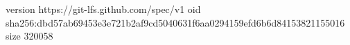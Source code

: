 version https://git-lfs.github.com/spec/v1
oid sha256:dbd57ab69453e3e721b2af9cd5040631f6aa0294159efd6b6d84153821155016
size 320058
